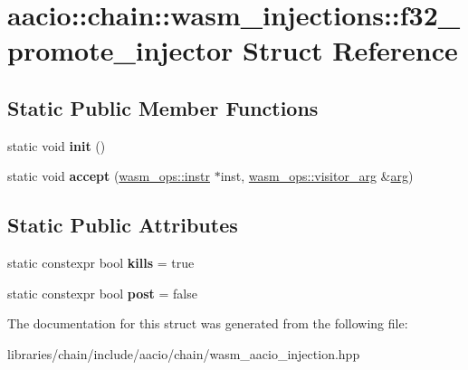 \hypertarget{structaacio_1_1chain_1_1wasm__injections_1_1f32__promote__injector}{}\section{aacio\+:\+:chain\+:\+:wasm\+\_\+injections\+:\+:f32\+\_\+promote\+\_\+injector Struct Reference}
\label{structaacio_1_1chain_1_1wasm__injections_1_1f32__promote__injector}
\subsection*{Static Public Member Functions}
\begin{DoxyCompactItemize}
\item 
\mbox{\label{structaacio_1_1chain_1_1wasm__injections_1_1f32__promote__injector_ad048a42468e50fc7a268b9fed4cf6b3c}} 
static void {\bfseries init} ()
\item 
\mbox{\label{structaacio_1_1chain_1_1wasm__injections_1_1f32__promote__injector_ac33404bb95c5512a8856d71a0e5168b2}} 
static void {\bfseries accept} (\mbox{\hyperlink{structaacio_1_1chain_1_1wasm__ops_1_1instr}{wasm\+\_\+ops\+::instr}} $\ast$inst, \mbox{\hyperlink{structaacio_1_1chain_1_1wasm__ops_1_1visitor__arg}{wasm\+\_\+ops\+::visitor\+\_\+arg}} \&\mbox{\hyperlink{unionarg}{arg}})
\end{DoxyCompactItemize}
\subsection*{Static Public Attributes}
\begin{DoxyCompactItemize}
\item 
\mbox{\label{structaacio_1_1chain_1_1wasm__injections_1_1f32__promote__injector_a7f14f2fe460f0504dee1ea43663a93a6}} 
static constexpr bool {\bfseries kills} = true
\item 
\mbox{\label{structaacio_1_1chain_1_1wasm__injections_1_1f32__promote__injector_aff298eead5a44d088146f0b36896a9a0}} 
static constexpr bool {\bfseries post} = false
\end{DoxyCompactItemize}


The documentation for this struct was generated from the following file\+:\begin{DoxyCompactItemize}
\item 
libraries/chain/include/aacio/chain/wasm\+\_\+aacio\+\_\+injection.\+hpp\end{DoxyCompactItemize}
